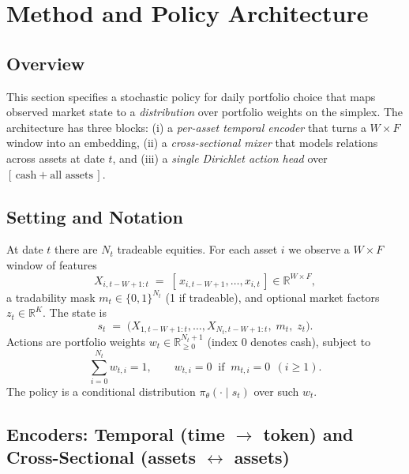 \documentclass[10pt,leqno]{amsart}
\begin{document}
\section{Method and Policy Architecture}
\label{sec:method-flat}

\subsection{Overview}
This section specifies a stochastic policy for daily portfolio choice that maps observed market state to a \emph{distribution} over portfolio weights on the simplex. The architecture has three blocks:
(i) a \textit{per-asset temporal encoder} that turns a $W{\times}F$ window into an embedding,
(ii) a \textit{cross-sectional mixer} that models relations across assets at date $t$, and
(iii) a \textit{single Dirichlet action head} over \([\,\text{cash} + \text{all assets}\,]\).


\subsection{Setting and Notation}
At date $t$ there are $N_t$ tradeable equities. For each asset $i$ we observe a $W{\times}F$ window of features
\[
X_{i,t-W+1:t} \;=\; [\,x_{i,t-W+1},\ldots,x_{i,t}\,]\in\mathbb{R}^{W\times F},
\]
a tradability mask $m_t\in\{0,1\}^{N_t}$ (1 if tradeable), and optional market factors $z_t\in\mathbb{R}^{K}$. The state is
\[
s_t \;=\; \big( X_{1,t-W+1:t},\ldots,X_{N_t,t-W+1:t},\; m_t,\; z_t \big).
\]
Actions are portfolio weights $w_t\in\mathbb{R}^{N_t+1}_{\ge 0}$ (index $0$ denotes cash), subject to
\[
\sum_{i=0}^{N_t} w_{t,i}=1,\qquad w_{t,i}=0\ \text{ if }\ m_{t,i}=0\ \ (i\ge 1).
\]
The policy is a conditional distribution $\pi_\theta(\cdot\mid s_t)$ over such $w_t$.

\subsection{Encoders: Temporal (time \texorpdfstring{$\to$}{→} token) and Cross-Sectional (assets \texorpdfstring{$\leftrightarrow$}{↔} assets)}
\end{document}
